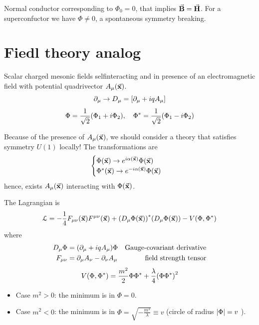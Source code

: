 \documentclass[../main/main.tex]{subfiles}
\begin{document}
Normal conductor corresponding to \( \Phi _0 = 0 \), that implies \( \va{B} = \va{H} \). For a superconfuctor we have \( \Phi \neq 0 \), a spontaneous symmetry breaking.

\section{Fiedl theory analog}
Scalar charged mesonic fields selfinteracting and in presence of an electromagnetic field with potential quadrivector \( A_ \mu  ( \va{x}) \).
\begin{equation}
  \partial_ \mu  \rightarrow  D _ \mu = \qty[ \partial_ \mu  + i q A _ \mu  ]
\end{equation}
\begin{equation}
  \Phi = \frac{1}{\sqrt{2} } \qty(\Phi _1 + i \Phi _2), \quad \Phi ^* = \frac{1}{\sqrt{2} } \qty(\Phi _1 - i \Phi _2)
\end{equation}
\begin{remark}
Because of the presence of \( A _ \mu (\va{x}) \), we should consider a theory that satisfies symmetry \( U(1) \) locally!
The transformations are
\begin{equation}
  \begin{cases}
   \Phi  ( \va{x} ) \rightarrow e^{i \alpha (\va{x})} \Phi (\va{x}) \\
  \Phi^*  ( \va{x} ) \rightarrow e^{-i \alpha (\va{x})} \Phi (\va{x})
  \end{cases}
\end{equation}
hence, exists \( A _ \mu (\va{x}) \) interacting with \( \Phi (\va{x}) \).

The Lagrangian is
\begin{equation}
  \mathcal{L} = - \frac{1}{4} F_ {\mu  \nu } (\va{x}) F ^{ \mu \nu } (\va{x})
  + \qty(D _ \mu  \Phi (\va{x}))^* \qty(D _ \mu \Phi (\va{x}))
  - V (\Phi ,\Phi ^*)
\end{equation}
where
\begin{subequations}
\begin{align}
  D_ \mu \Phi  &= \qty(\partial_ \mu  + i q A _ \mu  ) \Phi   & \text{Gauge-covariant derivative}\\
  F_ { \mu \nu } &= \partial_ \mu  A _ \nu  - \partial _ \nu  A _ \mu & \text{field strength tensor}
\end{align}
\end{subequations}
\begin{equation}
  V (\Phi , \Phi ^*) = \frac{m^2}{2} \Phi \Phi ^* + \frac{\lambda }{4} \qty(\Phi \Phi ^*)^2
\end{equation}
\begin{itemize}
\item Case \( m^2 >0 \): the minimum is in \( \Phi =0 \).
\item Case \( m^2 < 0 \): the minimum is in \( \Phi = \sqrt{- \frac{m^2}{\lambda }} \equiv v  \)    (circle of radius \( \abs{\Phi } = v \) ).
\end{itemize}
\end{remark}
\end{document}
